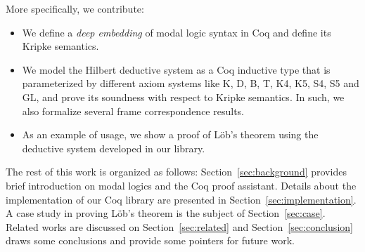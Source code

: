 \documentclass[sigconf]{acmart}
\begin{document}


More specifically, we contribute:

\begin{itemize}
  \item We define a \emph{deep embedding} of modal logic syntax in Coq and
    define its Kripke semantics.
  \item We model the Hilbert deductive system as a Coq inductive type that is
    parameterized by different axiom systems like K, D, B, T, K4, K5, S4, S5 and GL,
    and prove its soundness with respect to Kripke semantics.
    In such, we also formalize several frame correspondence results.
  \item As an example of usage, we show a proof of L\"ob's theorem using the deductive system
    developed in our library.
\end{itemize}

The rest of this work is organized as follows: Section~\ref{sec:background} provides
brief introduction on modal logics and the Coq proof assistant. Details about
the implementation of our Coq library are presented in
Section~\ref{sec:implementation}. A case study in proving L\"ob's theorem is
the subject of Section~\ref{sec:case}. Related works are discussed
on Section~\ref{sec:related} and Section~\ref{sec:conclusion} draws some conclusions and
provide some pointers for future work.
\end{document}

